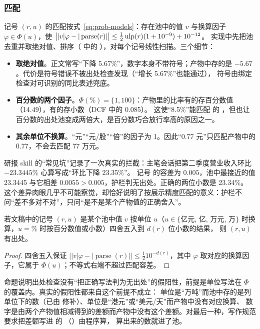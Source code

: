 \subsubsection{匹配}

记号 $(r,u)$ 的匹配按式~\eqref{eq:prob-models}：存在池中的值 $v$ 与换算因子 $\varphi\in\Phi(u)$，使 $\big||v|\varphi-|\operatorname{parse}(r)|\big|\le\tfrac12\operatorname{ulp}(r)(1+10^{-9})+10^{-12}$。
实现中先把池去重并取绝对值、排序（ 中的 ），对每个记号线性扫描。三个细节：
\begin{itemize}
\item \textbf{取绝对值}。正文常写“下降 5.67\%”，数字本身不带符号；产物中存的是 $-5.67$。代价是符号错误不被出处检查发现（“增长 5.67\%”也能通过），
  符号由绑定检查对可识别的同比表述兜底。
\item \textbf{百分数的两个因子}。$\Phi(\%)=\{1,100\}$：产物里的比率有的存百分数值（14.49），有的存小数（DCF 中的 0.085）。
  这使“8.5\%”能匹配  的 ，但也让百分数的出处池变成两倍大，是百分数巧合放行率高的原因之一。
\item \textbf{其余单位不换算}。“元”“元/股”“倍”的因子为 1。因此“0.77 元”只匹配产物中的 0.77，不会去匹配 77 万元。
\end{itemize}

\begin{example}[被拦下的心算]
研报 skill 的“常见坑”记录了一次真实的拦截：主笔会话把第二季度营业收入环比 $-23.3445\%$ 心算写成“环比下降 23.35\%”。
记号  的容差为 $0.005$，池中最接近的值 23.3445 与它相差 $0.0055>0.005$，护栏判无出处。正确的两位小数是 23.34\%。
这个差异肉眼几乎不可能察觉，却恰好说明了按展示精度匹配的意义：护栏不问“差不多对不对”，只问“是不是某个产物值的正确舍入”。
\end{example}

\begin{proposition}[出处检查对正确舍入是完备的]
\label{prop:guards-complete}
若文稿中的记号 $(r,u)$ 是某个池中值 $v$ 按单位 $u$（$u\in\{$亿元, 亿, 万元, 万$\}$ 时换算，$u=\%$ 时按百分数值或小数）四舍五入到 $d(r)$ 位小数的结果，
则 $(r,u)$ 有出处。
\end{proposition}
\begin{proof}
四舍五入保证 $\big||v|\varphi-|\operatorname{parse}(r)|\big|\le\tfrac12 10^{-d(r)}$，其中 $\varphi$ 取对应的换算因子，它属于 $\Phi(u)$；不等式右端不超过匹配容差。
\end{proof}

命题说明出处检查没有“把正确写法判为无出处”的假阳性，前提是单位写法在 $\Phi$ 的覆盖内。真实的假阳性都来自这个前提不成立：
单位是“万吨”而池中存的是列单位下的数（已由  修补）、单位是“港元”或“美元/天”而产物中没有对应换算、
数字是由两个产物值相减得到的差额而产物中没有这个差额。对最后一种，写作规范要求把差额写进  的 （）由程序算，
算出来的数就进了池。

